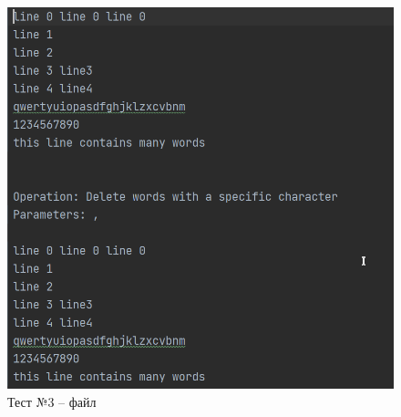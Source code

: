 \begin{figure}[H]
	\centering
	\includegraphics[width=0.6\linewidth]{photo/test.3.file}
	\caption{Тест №3 -- файл}
	\label{test.3.file}
\end{figure}
